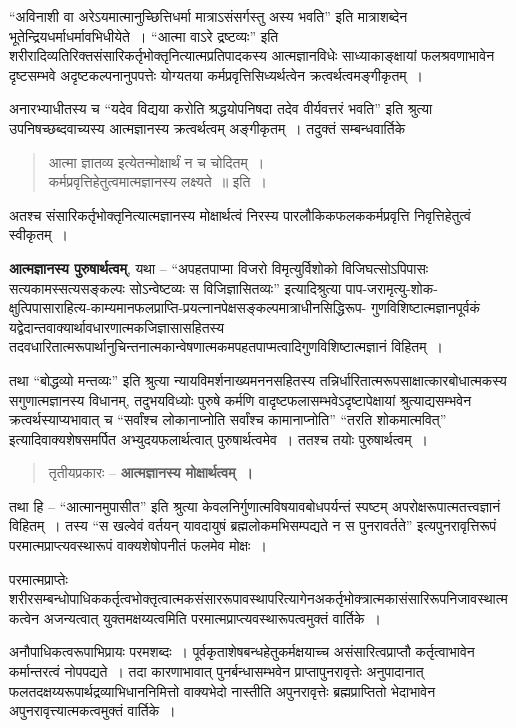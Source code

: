 {“अविनाशी वा अरेऽयमात्मानुच्छित्तिधर्मा मात्राऽसंसर्गस्तु अस्य भवति” इति मात्रा\-शब्देन भूतेन्द्रियधर्माधर्मावभिधीयेते~। “आत्मा वाऽरे द्रष्टव्यः” इति शरीरादिव्यतिरिक्त\-संसारिकर्तृभोक्तृनित्यात्मप्रतिपादकस्य आत्मज्ञानविधेः साध्याकाङ्क्षायां फलश्रवणाभावेन दृष्टसम्भवे अदृष्टकल्पनानुपपत्तेः योग्यतया कर्मप्रवृत्तिसिध्यर्थत्वेन क्रत्वर्थत्वमङ्गीकृतम्~। 

अनारभ्याधीतस्य च “यदेव विद्यया करोति श्रद्धयोपनिषदा तदेव वीर्यवत्तरं भवति” इति श्रुत्या उपनिषच्छब्दवाच्यस्य आत्मज्ञानस्य क्रत्वर्थत्वम् अङ्गीकृतम्~। तदुक्तं सम्बन्धवार्तिके 
\begin{verse}
आत्मा ज्ञातव्य इत्येतन्मोक्षार्थं न च चोदितम्~। \\
कर्मप्रवृत्तिहेतुत्वमात्मज्ञानस्य लक्ष्यते~॥ इति~। 
\end{verse}
अतश्च संसारिकर्तृभोक्तृनित्यात्मज्ञानस्य मोक्षार्थत्वं निरस्य पारलौकिकफलककर्मप्रवृत्ति निवृत्तिहेतुत्वं स्वीकृतम्~। 

\textbf{आत्मज्ञानस्य पुरुषार्थत्वम्}, यथा – “अपहतपाप्मा विजरो विमृत्युर्विशोको विजिघत्सोऽपिपासः सत्यकामस्सत्यसङ्कल्पः सोऽन्वेष्टव्यः स विजिज्ञासितव्यः” इत्यादि\-श्रुत्या पाप-जरामृत्यु-शोक-क्षुत्पिपासाराहित्य-काम्यमानफलप्राप्ति-प्रयत्नानपेक्षसङ्कल्पमात्राधीन\-सिद्धिरूप- गुणविशिष्टात्मज्ञानपूर्वकं यद्वेदान्तवाक्यार्थावधारणात्मकजिज्ञासासहितस्य तदवधारितात्मरूपार्थानुचिन्तनात्मकान्वेषणात्मकमपहतपाप्मत्वादिगुणविशिष्टात्मज्ञानं विहितम्~। 

तथा “बोद्धव्यो मन्तव्यः” इति श्रुत्या न्यायविमर्शनाख्यमननसहितस्य तन्निर्धारितात्मरूपसाक्षात्कारबोधात्मकस्य सगुणात्मज्ञानस्य विधानम्, तदुभयविध्योः पुरुषे कर्मणि वा\break दृष्टफलासम्भवेऽदृष्टापेक्षायां श्रुत्याद्यसम्भवेन क्रत्वर्थस्याप्यभावात् च “सर्वांश्च लोकानाप्नोति सर्वांश्च कामानाप्नोति” “तरति शोकमात्मवित्” इत्यादिवाक्यशेषसमर्पित अभ्युदय\-फलार्थत्वात् पुरुषार्थत्वमेव~। ततश्च तयोः पुरुषार्थत्वम्~। 
\begin{verse}
तृतीयप्रकारः – \textbf{आत्मज्ञानस्य मोक्षार्थत्वम्~। }
\end{verse}
तथा हि – “आत्मानमुपासीत” इति श्रुत्या केवलनिर्गुणात्मविषयावबोधपर्यन्तं स्पष्टम् अपरोक्षरूपात्मतत्त्वज्ञानं विहितम्~। तस्य “स खल्वेवं वर्तयन् यावदायुषं ब्रह्मलोकमभिसम्पद्यते न स पुनरावर्तते” इत्यपुनरावृत्तिरूपं परमात्मप्राप्त्यवस्थारूपं वाक्यशेषोपनीतं फलमेव मोक्षः~। 

परमात्मप्राप्तेः शरीरसम्बन्धोपाधिककर्तृत्वभोक्तृत्वात्मकसंसाररूपावस्थापरित्यागेन\break अकर्तृभोक्त्रात्मकासंसारिरूपनिजावस्थात्मकत्वेन अजन्यत्वात् युक्तमक्षय्यत्वमिति परमात्म\-प्राप्त्यवस्थारूपत्वमुक्तं वार्तिके~। 

अनौपाधिकत्वरूपाभिप्रायः परमशब्दः~। पूर्वकृताशेषबन्धहेतुकर्मक्षयाच्च असंसारित्व\-प्राप्तौ कर्तृत्वाभावेन कर्मान्तरत्वं नोपपद्यते~। तदा कारणाभावात् पुनर्बन्धासम्भवेन प्राप्तापुनरावृत्तेः अनुपादानात् फलतदक्षय्यरूपार्थद्रव्याभिधाननिमित्तो वाक्यभेदो नास्तीति अपुनरावृत्तेः ब्रह्मप्राप्तितो भेदाभावेन अपुनरावृत्त्यात्मकत्वमुक्तं वार्तिके~। 

}
